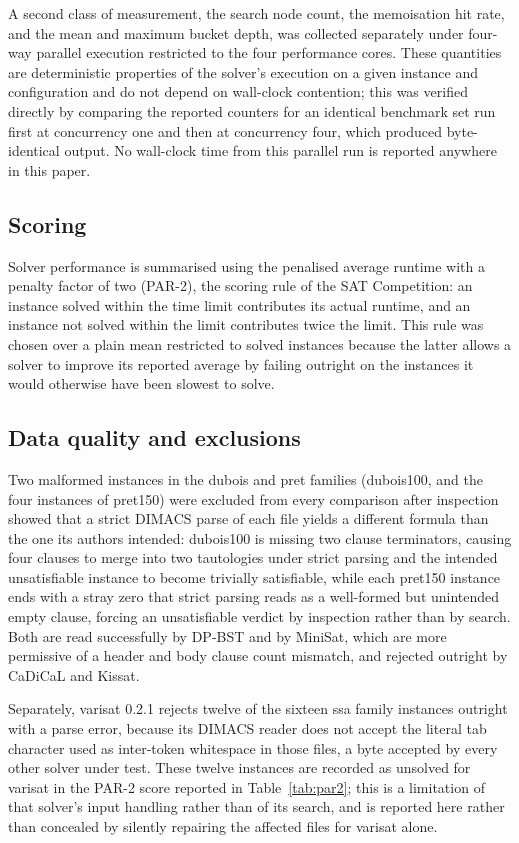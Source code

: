 \documentclass[conference]{IEEEtran}
\begin{document}
A second class of measurement, the search node count, the memoisation hit rate, and the mean and
maximum bucket depth, was collected separately under four-way parallel execution restricted to the
four performance cores. These quantities are deterministic properties of the solver's execution on
a given instance and configuration and do not depend on wall-clock contention; this was verified
directly by comparing the reported counters for an identical benchmark set run first at
concurrency one and then at concurrency four, which produced byte-identical output. No wall-clock
time from this parallel run is reported anywhere in this paper.

\subsection{Scoring}

Solver performance is summarised using the penalised average runtime with a penalty factor of two
(PAR-2), the scoring rule of the SAT Competition: an instance solved within the time limit
contributes its actual runtime, and an instance not solved within the limit contributes twice the
limit. This rule was chosen over a plain mean restricted to solved instances because the latter
allows a solver to improve its reported average by failing outright on the instances it would
otherwise have been slowest to solve.

\subsection{Data quality and exclusions}

Two malformed instances in the dubois and pret families (dubois100, and the four instances of
pret150) were excluded from every comparison after inspection showed that a strict DIMACS parse
of each file yields a different formula than the one its authors intended: dubois100 is missing
two clause terminators, causing four clauses to merge into two tautologies under strict parsing
and the intended unsatisfiable instance to become trivially satisfiable, while each pret150
instance ends with a stray zero that strict parsing reads as a well-formed but unintended empty
clause, forcing an unsatisfiable verdict by inspection rather than by search. Both are read
successfully by DP-BST and by MiniSat, which are more permissive of a header and body clause count
mismatch, and rejected outright by CaDiCaL and Kissat.

Separately, varisat 0.2.1 rejects twelve of the sixteen ssa family instances outright with a
parse error, because its DIMACS reader does not accept the literal tab character used as
inter-token whitespace in those files, a byte accepted by every other solver under test. These
twelve instances are recorded as unsolved for varisat in the PAR-2 score reported in
Table~\ref{tab:par2}; this is a limitation of that solver's input handling rather than of its
search, and is reported here rather than concealed by silently repairing the affected files for
varisat alone.
\end{document}
